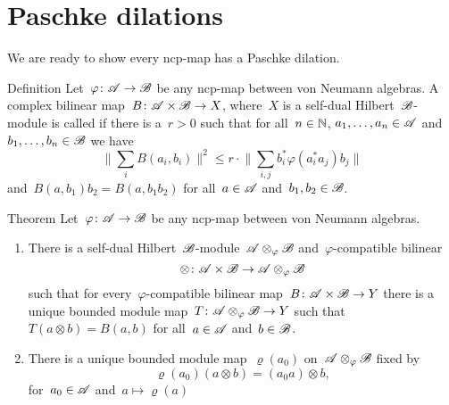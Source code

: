 \documentclass[b]{subfiles}
\begin{document}
\section{Paschke dilations}
\begin{parsec}%
\begin{point}%
    We are ready to show every ncp-map has a Paschke dilation.
\end{point}
\begin{point}{Definition}%
    Let~$\varphi\colon \mathscr{A} \to \mathscr{B}$ be any ncp-map between
        von Neumann algebras.
    A complex bilinear map~$B \colon \mathscr{A} \times \mathscr{B} \to X$,
        where~$X$ is a self-dual Hilbert~$\mathscr{B}$-module is
        called 
        if there is a~$r > 0$
        such that for all~$n\in \mathbb{N}$, $a_1, \ldots, a_n \in \mathscr{A}$
        and~$b_1, \ldots, b_n \in \mathscr{B}$ we have
        \begin{equation}
            \bigl\| \sum_i B(a_i,b_i)\bigr\|^2
                \leq r \cdot \bigl\| \sum_{i,j} b_i^* \varphi(a_i^*a_j)b_j
                \bigr\| \label{phi-compatible}
        \end{equation}
        and~$B(a,b_1)b_2 = B(a,b_1b_2)$
        for all~$a \in \mathscr{A}$ and~$b_1,b_2 \in \mathscr{B}$.
\end{point}
\begin{point}{Theorem}%
    Let~$\varphi\colon \mathscr{A} \to \mathscr{B}$ be any ncp-map between
        von Neumann algebras.
\begin{enumerate}
    \item There is a self-dual Hilbert~$\mathscr{B}$-module~$\mathscr{A} \otimes_\varphi
            \mathscr{B}$ and~$\varphi$-compatible bilinear
    \begin{equation*}
        \otimes \colon \mathscr{A} \times \mathscr{B} \to \mathscr{A} \otimes_\varphi \mathscr{B}
    \end{equation*}
    such that for every~$\varphi$-compatible bilinear
    map~$B \colon \mathscr{A} \times \mathscr{B} \to Y$
    there is a unique bounded
    module map~$T\colon \mathscr{A} \otimes_\varphi \mathscr{B} \to Y$
    such that~$T(a \otimes b) = B(a,b)$ for all~$a \in \mathscr{A}$ and~$b \in \mathscr{B}$.
\item
    There is a unique bounded module
        map~$\varrho(a_0)$ on~$\mathscr{A} \otimes_\varphi \mathscr{B}$
            fixed by
            \begin{equation*}
                \varrho(a_0)(a\otimes b) = (a_0 a)\otimes b,
            \end{equation*}
        for~$a_0 \in \mathscr{A}$
    and~$a \mapsto \varrho(a)$

\end{enumerate}
\end{point}
\end{parsec}
\end{document}
